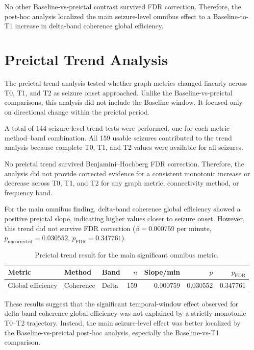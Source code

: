 No other Baseline-vs-preictal contrast survived FDR correction. Therefore, the
post-hoc analysis localized the main seizure-level omnibus effect to a
Baseline-to-T1 increase in delta-band coherence global efficiency.

\section{Preictal Trend Analysis}
\label{sec:results-preictal-trend}

The preictal trend analysis tested whether graph metrics changed linearly across
T0, T1, and T2 as seizure onset approached. Unlike the Baseline-vs-preictal
comparisons, this analysis did not include the Baseline window. It focused only
on directional change within the preictal period.

A total of \num{144} seizure-level trend tests were performed, one for each
metric--method--band combination. All \num{159} usable seizures contributed to
the trend analysis because complete T0, T1, and T2 values were available for all
seizures.

No preictal trend survived Benjamini--Hochberg FDR correction. Therefore, the
analysis did not provide corrected evidence for a consistent monotonic increase
or decrease across T0, T1, and T2 for any graph metric, connectivity method, or
frequency band.

For the main omnibus finding, delta-band coherence global efficiency showed a
positive preictal slope, indicating higher values closer to seizure onset.
However, this trend did not survive FDR correction
($\beta = 0.000759$ per minute, $p_{\mathrm{uncorrected}} = 0.030552$,
$p_{\mathrm{FDR}} = 0.347761$).

\begin{table}[H]
    \centering
    \begin{tabular}{lllrrrr}
        \toprule
        Metric & Method & Band & $n$ & Slope/min & $p$ & $p_{\mathrm{FDR}}$ \\
        \midrule
        Global efficiency
        & Coherence
        & Delta
        & 159
        & 0.000759
        & 0.030552
        & 0.347761 \\
        \bottomrule
    \end{tabular}
    \caption{Preictal trend result for the main significant omnibus metric.}
    \label{tab:preictal-trend-global-efficiency-delta-coherence}
\end{table}

These results suggest that the significant temporal-window effect observed for
delta-band coherence global efficiency was not explained by a strictly
monotonic T0--T2 trajectory. Instead, the main seizure-level effect was better
localized by the Baseline-vs-preictal post-hoc analysis, especially the
Baseline-vs-T1 comparison.

